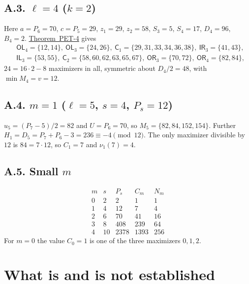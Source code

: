 \documentclass[11pt]{amsart}
\theoremstyle{definition}
\theoremstyle{remark}
\theoremstyle{plain}
\numberwithin{equation}{section}
\newcommand{\CC}{\mathsf{C}}
\newcommand{\OL}{\mathsf{OL}}
\newcommand{\OR}{\mathsf{OR}}
\newcommand{\IL}{\mathsf{IL}}
\newcommand{\IR}{\mathsf{IR}}
\newcommand{\PETfour}{\hyperref[thm:pet4]{Theorem~PET-4}}
\begin{document}
\subsection*{\texorpdfstring{A.3. $\ell=4$ ($k=2$)}{A.3. l=4 (k=2)}}
Here $a=P_6=70$, $c=P_5=29$, $z_1=29$, $z_2=58$, $S_3=5$, $S_4=17$, $D_4=96$, $B_4=2$. \PETfour{}
gives
\[
\begin{aligned}
&\OL_4=\{12,14\},\ \OL_3=\{24,26\},\ \CC_1=\{29,31,33,34,36,38\},\ \IR_3=\{41,43\},\\
&\IL_3=\{53,55\},\ \CC_2=\{58,60,62,63,65,67\},\ \OR_3=\{70,72\},\ \OR_4=\{82,84\},
\end{aligned}
\]
$24=16\cdot2-8$ maximizers in all, symmetric about $D_4/2=48$, with $\min M_4=v=12$.

\subsection*{\texorpdfstring{A.4. $m=1$ ($\ell=5$, $s=4$, $P_s=12$)}{A.4. m=1 (l=5, s=4, P\_s=12)}}
$u_5=(P_7-5)/2=82$ and $U=P_6=70$, so $M_5=\{82,84,152,154\}$. Further $H_1=D_5=P_7+P_6-3=236\equiv-4
\pmod{12}$. The only maximizer divisible by $12$ is $84=7\cdot12$, so $C_1=7$ and $\nu_1(7)=4$.

\subsection*{\texorpdfstring{A.5. Small $m$}{A.5. Small m}}
\[
\begin{array}{c|c|c|c|c}
m & s & P_s & C_m & N_m\\\hline
0 & 2 & 2 & 1 & 1\\
1 & 4 & 12 & 7 & 4\\
2 & 6 & 70 & 41 & 16\\
3 & 8 & 408 & 239 & 64\\
4 & 10 & 2378 & 1393 & 256
\end{array}
\]
For $m=0$ the value $C_0=1$ is one of the three maximizers $0,1,2$.

\section{What is and is not established}\label{app:status}
\end{document}
